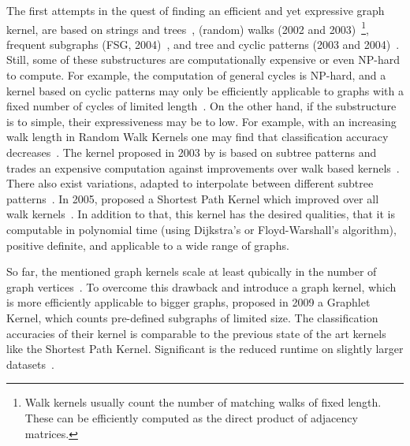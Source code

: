 		The first attempts in the quest of finding an efficient and yet expressive graph kernel, are based on strings and trees~\cite{1999_Haussler_CONF}, 
		(random) walks (2002 and 2003)~\cite{2002_Gartner_NIPS, 2003_Kashima_ICML}\footnote{Walk kernels usually count the number of matching walks of fixed length. These can be efficiently computed as the direct product of adjacency matrices.}, 
		frequent subgraphs (FSG, 2004)~\cite{2004_Kuramochi_IEEE}, and
		tree and cyclic patterns (2003 and 2004)~\cite{2003_Ramon_CONF, 2004_Horvath_KDD}.			
		Still, some of these substructures are computationally expensive or even NP-hard to compute. 
		For example, the computation of general cycles is NP-hard, and a kernel based on cyclic patterns may only be efficiently applicable to graphs with a fixed number of cycles of limited length~\cite{2005_Borgwardt_IEEE}.
		On the other hand, if the substructure is to simple, their expressiveness may be to low.
		For example, with an increasing walk length in Random Walk Kernels one may find that classification accuracy decreases~\cite{2005_Borgwardt_IEEE}.
		The kernel proposed in 2003 by \citeauthor{2003_Ramon_CONF} is based on subtree patterns and trades an expensive computation against improvements over walk based kernels~\cite{2003_Ramon_CONF}.
		There also exist variations, adapted to interpolate between different subtree patterns~\cite{2008_Mahe_CONF}.
		In 2005, \citeauthor{2005_Borgwardt_IEEE} proposed a Shortest Path Kernel which improved over all walk kernels~\cite{2005_Borgwardt_IEEE}.	
		In addition to that, this kernel has the desired qualities, that it is computable in polynomial time (using Dijkstra's or Floyd-Warshall's algorithm), positive definite, and applicable to a wide range of graphs.
	
		So far, the mentioned graph kernels scale at least qubically in the number of graph vertices~\cite{2009_Shervashidze_PMLR}.
		To overcome this drawback and introduce a graph kernel, which is more efficiently applicable to bigger graphs, \citeauthor{2009_Shervashidze_PMLR} proposed in 2009 a Graphlet Kernel, which counts pre-defined subgraphs of limited size.
		The classification accuracies of their kernel is comparable to the previous state of the art kernels like the Shortest Path Kernel.
		Significant is the reduced runtime on slightly larger datasets~\cite{2009_Shervashidze_PMLR}.
		
				
